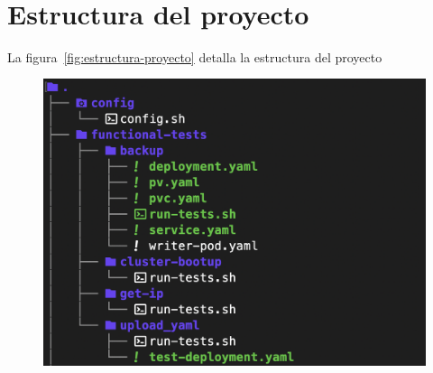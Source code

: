 \label{cap:pmv}
\mbox{}\\
\section{Estructura del proyecto}
\noindent
La figura~\ref{fig:estructura-proyecto} detalla la estructura del proyecto
\begin{figure}[H]
    \centering
    \begin{minipage}{0.48\textwidth}
        \centering
        \includegraphics[scale=0.35]{tablas-images/cp6/src/tree-1.png}
        \label{fig:estructura-proyecto-1}
    \end{minipage}
    \hfill
    \begin{minipage}{0.48\textwidth}
        \centering

\end{minipage}
\end{figure}
